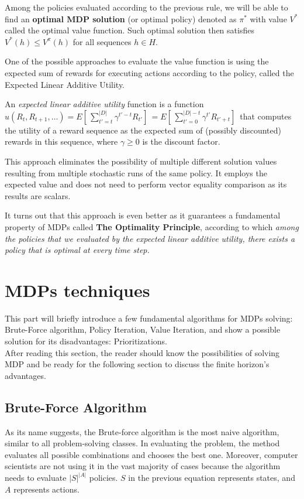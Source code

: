 Among the policies evaluated according to the previous rule, we will be able to find an \textbf{optimal MDP solution} (or optimal policy) denoted as $\pi^*$ with value $V^*$ called the optimal value function. Such optimal solution then satisfies $V^{*} (h) \leqslant V^{\pi} (h)$ for all sequences $h \in H$.

One of the possible approaches to evaluate the value function is using the expected sum of rewards for executing actions according to the policy, called the Expected Linear Additive Utility.
\\
\begin{definition}
An \textit{expected linear additive utility} function is a function $u(R_t, R_{t+1}, \ldots) = E[ \,\sum_{t'=t}^{|D|} \gamma ^{t'−t} R_{t'}] \, = E[ \,\sum_{t'=0}^{|D|-t} \gamma^{t'} R_{t'+t}] \,$ that computes the utility of a
reward sequence as the expected sum of (possibly discounted) rewards in this sequence, where $\gamma \geqslant 0$
is the discount factor.
\end{definition}

This approach eliminates the possibility of multiple different solution values resulting from multiple stochastic runs of the same policy. It employs the expected value and does not need to perform vector equality comparison as its results are scalars.

It turns out that this approach is even better as it guarantees a fundamental property of MDPs called \textbf{The Optimality Principle}, according to which \textit{among the policies that we evaluated by the expected linear additive utility, there exists a policy that is optimal at every time step.}

\section{MDPs techniques}

This part will briefly introduce a few fundamental algorithms for MDPs solving: Brute-Force algorithm, Policy Iteration, Value Iteration, and show a possible solution for its disadvantages: Prioritizations. \\
After reading this section, the reader should know the possibilities of solving MDP and be ready for the following section to discuss the finite horizon's advantages.

\subsection{Brute-Force Algorithm}
As its name suggests, the Brute-force algorithm is the most naive algorithm, similar to all problem-solving classes. In evaluating the problem, the method evaluates all possible combinations and chooses the best one.
Moreover, computer scientists are not using it in the vast majority of cases because the algorithm needs to evaluate $|S|^{|A|}$ policies.
$S$ in the previous equation represents states, and $A$ represents actions.

